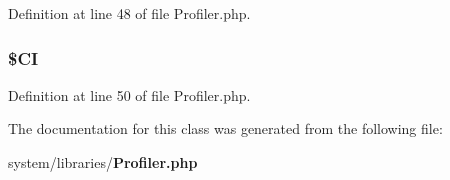Definition at line 48 of file Profiler.\-php.

\subsubsection[{\$\-C\-I}]{\setlength{\rightskip}{0pt plus 5cm}\$C\-I\hspace{0.3cm}{\ttfamily [protected]}}\label{class_c_i___profiler_ae0314d046ddf7fcfaec03222977427d3}


Definition at line 50 of file Profiler.\-php.



The documentation for this class was generated from the following file\-:\begin{DoxyCompactItemize}
\item 
system/libraries/{\bf Profiler.\-php}\end{DoxyCompactItemize}

